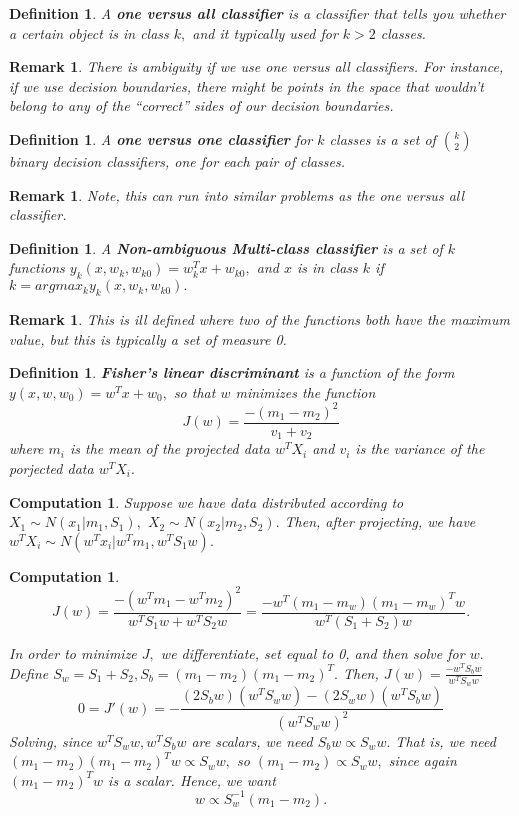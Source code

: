 \documentclass{amsart}
\newtheorem{comp}[subsubsection]{Computation}
\newtheorem{defn}[subsubsection]{Definition}
\newtheorem{rem}[subsubsection]{Remark}
\begin{document}
\begin{defn}
A {\bf one versus all classifier} is a classifier that tells you whether a certain object is in class $k,$ and it typically used for $k>2$ classes.
\end{defn}

\begin{rem}
There is ambiguity if we use one versus all classifiers. For instance, if we use decision boundaries, there might be points in the space that wouldn't belong to any of the ``correct'' sides of our decision boundaries.
\end{rem}

\begin{defn}
A {\bf one versus one classifier} for $k$ classes is a set of $\binom k 2$ binary decision classifiers, one for each pair of classes. 
\end{defn}

\begin{rem}
Note, this can run into similar problems as the one versus all classifier.
\end{rem}

\begin{defn}
A {\bf Non-ambiguous Multi-class classifier} is a set of $k$ functions $y_k(x,w_k,w_{k0}) = w_k^Tx + w_{k0},$ and $x$ is in class $k$ if $k = argmax_k y_k(x,w_k,w_{k0}).$
\end{defn}

\begin{rem}
This is ill defined where two of the functions both have the maximum value, but this is typically a set of measure 0.
\end{rem}

\begin{defn}
{\bf Fisher's linear discriminant} is a function of the form $y(x,w,w_0) = w^Tx + w_0,$ so that $w$ minimizes the function 
$$J(w) = \frac{-(m_1 - m_2)^2}{v_1+v_2}$$
where $m_i$ is the mean of the projected data $w^TX_i$ and $v_i$ is the variance of the porjected data $w^TX_i.$
\end{defn}

\begin{comp}
Suppose we have data distributed according to $X_1 \sim N(x_1|m_1,S_1),$ $X_2 \sim N(x_2|m_2,S_2).$ Then, after projecting, we have $w^TX_i \sim N(w^Tx_i|w^Tm_1,w^T S_1 w).$
\end{comp}

\begin{comp}
$$J(w) = \frac{-(w^Tm_1 - w^Tm_2)^2}{w^TS_1w+w^TS_2w} = \frac{-w^T(m_1 - m_w)(m_1 - m_w)^Tw}{w^T(S_1+S_2)w}.$$

In order to minimize $J,$ we differentiate, set equal to 0, and then solve for $w.$
Define $S_w = S_1 + S_2, S_b = (m_1 - m_2)(m_1 - m_2)^T.$
Then, $J(w) = \frac{-w^T S_b w}{w^T S_w w}$
$$0= J'(w) = -\frac{(2S_b w)(w^TS_w w) - (2S_w w)(w^T S_bw)}{(w^TS_ww)^2}$$
Solving, since $w^TS_ww, w^TS_bw$ are scalars, we need
$S_b w \propto S_w w.$
That is, we need $(m_1 - m_2)(m_1 - m_2)^Tw \propto S_w w,$
so $(m_1 - m_2) \propto S_w w,$ since again $(m_1 - m_2)^Tw$ is a scalar.
Hence, we want 
$$w \propto S_w^{-1}(m_1-m_2).$$
\end{comp}
\end{document}
